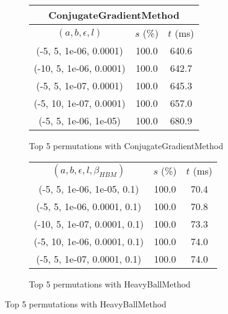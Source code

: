 \begin{figure}[H]
\begin{subfigure}[ht]{.5\textwidth}
\begin{tabular}{|c|c|c|}
\multicolumn{3}{|c|}{ConjugateGradientMethod} \\
\hline
\rowcolor{gray!25}
$(a,b,\epsilon,l)$ & $s$ (\%) & $t$ (ms) \\
\hline
(-5, 5, 1e-06, 0.0001) & 100.0 & 640.6 \\
(-10, 5, 1e-06, 0.0001) & 100.0 & 642.7 \\
(-5, 5, 1e-07, 0.0001) & 100.0 & 645.3 \\
(-5, 10, 1e-07, 0.0001) & 100.0 & 657.0 \\
(-5, 5, 1e-06, 1e-05) & 100.0 & 680.9 \\
\hline
\end{tabular}
\caption{Top 5 permutations with ConjugateGradientMethod}
\label{subfig:param_comp_NegativeEntropy_ConjugateGradientMethod_DichotomousSearch}
\end{subfigure}
\hfill
\begin{subfigure}[ht]{.5\textwidth}
\begin{tabular}{|c|c|c|}
\hline
\rowcolor{gray!25}
\multicolumn{3}{|c|}{HeavyBallMethod} \\
\hline
\rowcolor{gray!25}
$(a,b,\epsilon,l,\beta_{HBM})$ & $s$ (\%) & $t$ (ms) \\
\hline
(-5, 5, 1e-06, 1e-05, 0.1) & 100.0 & 70.4 \\
(-5, 5, 1e-06, 0.0001, 0.1) & 100.0 & 70.8 \\
(-10, 5, 1e-07, 0.0001, 0.1) & 100.0 & 73.3 \\
(-5, 10, 1e-06, 0.0001, 0.1) & 100.0 & 74.0 \\
(-5, 5, 1e-07, 0.0001, 0.1) & 100.0 & 74.0 \\
\hline
\end{tabular}
\caption{Top 5 permutations with HeavyBallMethod}
\label{subfig:param_comp_NegativeEntropy_HeavyBallMethod_DichotomousSearch}
\end{subfigure}
\end{figure}